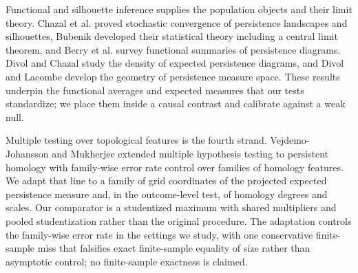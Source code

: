 Functional and silhouette inference supplies the population objects and their limit theory. Chazal et al. \cite{chazal_socg_2014} proved stochastic convergence of persistence landscapes and silhouettes, Bubenik \cite{bubenik_jmlr_2015} developed their statistical theory including a central limit theorem, and Berry et al. \cite{berry_jact_2020} survey functional summaries of persistence diagrams. Divol and Chazal \cite{divol_chazal_2020} study the density of expected persistence diagrams, and Divol and Lacombe \cite{divol_lacombe_2021} develop the geometry of persistence measure space. These results underpin the functional averages and expected measures that our tests standardize; we place them inside a causal contrast and calibrate against a weak null.

Multiple testing over topological features is the fourth strand. Vejdemo-Johansson and Mukherjee \cite{vejdemo_mukherjee_2022} extended multiple hypothesis testing to persistent homology with family-wise error rate control over families of homology features. We adapt that line to a family of grid coordinates of the projected expected persistence measure and, in the outcome-level test, of homology degrees and scales. Our comparator is a studentized maximum with shared multipliers and pooled studentization rather than the original procedure. The adaptation controls the family-wise error rate in the settings we study, with one conservative finite-sample miss that falsifies exact finite-sample equality of size rather than asymptotic control; no finite-sample exactness is claimed.
